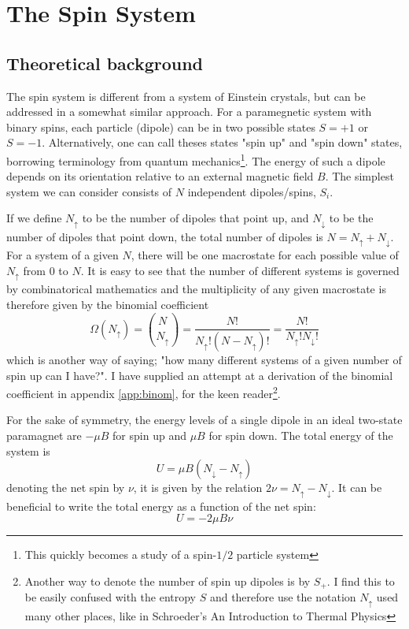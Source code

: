 \documentclass[10pt,a4paper]{amsart}
\begin{document}
\section{The Spin System}

\subsection{Theoretical background}
The spin system is different from a system of Einstein crystals, but can be addressed in a somewhat similar approach. For a paramegnetic system with binary spins, each particle (dipole) can be in two possible states $S=+1$ or $S=-1$. Alternatively, one can call theses states "spin up" and "spin down" states, borrowing terminology from quantum mechanics\footnote{This quickly becomes a study of a spin-$1/2$ particle system}. The energy of such a dipole depends on its orientation relative to an external magnetic field $B$. The simplest system we can consider consists of $N$ independent dipoles/spins, $S_i$. 

If we define $N_{\uparrow}$ to be the number of dipoles that point up, and $N_{\downarrow}$ to be the number of dipoles that point down, the total number of dipoles is $N=N_{\uparrow}+N_{\downarrow}$. For a system of a given $N$, there will be one macrostate for each possible value of $N_{\uparrow}$ from $0$ to $N$. It is easy to see that the number of different systems is governed by combinatorical mathematics and the multiplicity of any given macrostate is therefore given by the binomial coefficient
\begin{equation}
\Omega(N_{\uparrow}) = \binom{N}{N_{\uparrow}}=\frac{N!}{N_{\uparrow}!(N-N_{\uparrow})!}=\frac{N!}{N_{\uparrow}!N_{\downarrow}!}
\end{equation}
which is another way of saying; "how many different systems of a given number of spin up can I have?". I have supplied an attempt at a derivation of the binomial coefficient in appendix \ref{app:binom}, for the keen reader\footnote{Another way to denote the number of spin up dipoles is by $S_+$. I find this to be easily confused with the entropy $S$ and therefore use the notation $N_{\uparrow}$ used many other places, like in Schroeder's An Introduction to Thermal Physics}.

For the sake of symmetry, the energy levels of a single dipole in an ideal two-state paramagnet are $-\mu B$ for spin up and $\mu B$ for spin down. The total energy of the system is
\begin{equation}
\label{eq:energyspin1}
U = \mu B(N_{\downarrow}-N_{\uparrow})
\end{equation}
denoting the net spin by $\nu$, it is given by the relation $2\nu = N_{\uparrow}-N_{\downarrow}$. It can be beneficial to write the total energy as a function of the net spin:
\begin{equation}
U = -2\mu B \nu
\end{equation} 
\end{document}
